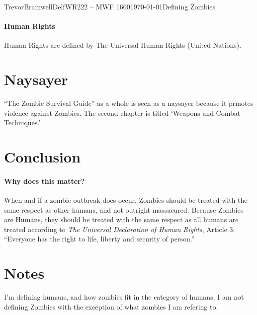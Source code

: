 \documentclass[12pt,letterpaper]{article}
\begin{document}
\begin{mla}{Trevor}{Bramwell}{Delf}{WR222 -- MWF 1600}{\today}{Defining Zombies}
\paragraph{Human Rights}
Human Rights are defined by The Universal Human Rights (United Nations).


\section*{Naysayer}
``The Zombie Survival Guide'' as a whole is seen as a naysayer because it
prmotes violence against Zombies. The second chapter is titled `Weapons and
Combat Techniques.'


\section*{Conclusion}
\paragraph{Why does this matter?}
When and if a zombie outbreak does occur, Zombies should be treated with the
same respect as other humans, and not outright massacured. Because Zombies are
Humans, they should be treated with the same respect as all humans are treated
according to \emph{The Universal Declaration of Human Rights}, Article 3:
``Everyone has the right to life, liberty and security of person.''



\section*{Notes}
I'm defining humans, and how zombies fit in the category of humans.
I am not defining Zombies with the exception of what zombies I am refering to.




\end{mla}
\end{document}
